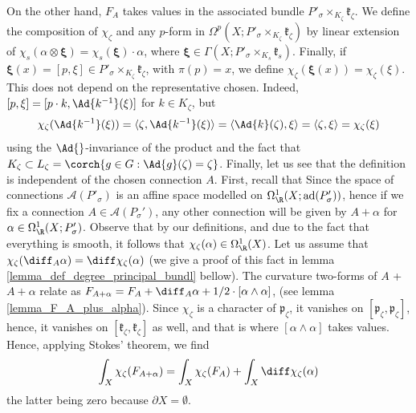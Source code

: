 {\begin{obs}
    On the other hand, \(F_A\) takes values in the associated bundle \(P'_\sigma \times _{K_\zeta}\mathfrak{k}_\zeta\). We define the composition of \(\chi_\zeta\) and any \(p\)-form in \(\Omega^p(X; P'_\sigma \times_{K_\zeta} \mathfrak{k}_\zeta)\) by linear extension of \(\chi_s(\alpha \otimes \bm{\xi})=\chi_s(\bm{\xi})\cdot\alpha\), where \(\bm{\xi}\in \Gamma(X; P'_\sigma \times_{K_s}\mathfrak{k}_s)\). Finally, if \(\bm{\xi}(x)=[p, \xi]\in P'_\sigma \times_{K_\zeta}\mathfrak{k}_\zeta\), with \(\pi(p)=x\), we define \(\chi_\zeta(\bm{\xi}(x))=\chi_\zeta(\xi)\). This does not depend on the representative chosen. Indeed, \([p, \xi]=[p\cdot k, \Ad{k^{-1}}(\xi)]\) for \(k \in K_\zeta\), but
    \[
    \chi_\zeta(\Ad{k^{-1}}(\xi))=\langle \zeta, \Ad{k^{-1}}(\xi) \rangle = \langle \Ad{k}(\zeta), \xi \rangle = \langle \zeta, \xi \rangle = \chi_\zeta(\xi)
    \]
    using the \(\Ad{}\)-invariance of the product and the fact that \(K_\zeta \subset L_\zeta=\corch{g\in G: \Ad{g}(\zeta)=\zeta}\). Finally, let us see that the definition is independent of the chosen connection \(A\). First, recall that Since the space of connections \(\mathscr{A}(P'_\sigma)\) is an affine space modelled on \(\Omega^1_\R(X; \mathrm{ad}(P_\sigma'))\), hence if we fix a connection \(A \in \mathscr{A}(P_\sigma')\), any other connection will be given by \(A+\alpha\) for \(\alpha \in \Omega_\R^1(X; P_\sigma')\). Observe that by our definitions, and due to the fact that everything is smooth, it follows that \(\chi_\zeta(\alpha)\in \Omega_\R^1(X)\). Let us assume that \(\chi_\zeta(\diff_A \alpha)=\diff \chi_\zeta(\alpha)\) (we give a proof of this fact in lemma \ref{lemma_def_degree_principal_bundl} bellow). The curvature two-forms of \(A\) + \(A+\alpha\) relate as \(F_{A+\alpha}=F_A+\diff_A \alpha + 1/2 \cdot [\alpha \wedge \alpha]\), (see lemma \ref{lemma_F_A_plus_alpha}). Since \(\chi_\zeta\) is a character of \(\mathfrak{p}_\zeta\), it vanishes on \([\mathfrak{p}_\zeta, \mathfrak{p}_\zeta]\), hence, it vanishes on \([\mathfrak{k}_\zeta, \mathfrak{k}_\zeta]\) as well, and that is where \([\alpha \wedge \alpha]\) takes values. Hence, applying Stokes' theorem, we find
    \[
    \int_X \chi_\zeta(F_{A+\alpha})=\int_X \chi_\zeta(F_A) + \int_X \diff \chi_\zeta(\alpha)
    \]
    the latter being zero because \(\partial X=\emptyset\).

\end{obs}}
